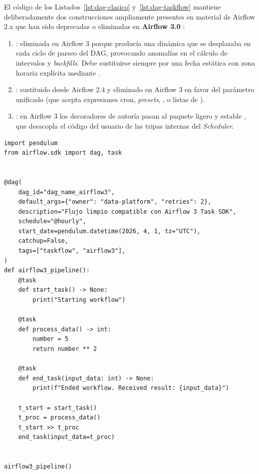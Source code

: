 \begin{modernbox}
El código de los Listados~\ref{lst:dag-clasico} y~\ref{lst:dag-taskflow} mantiene deliberadamente dos construcciones ampliamente presentes en material de Airflow 2.x que han sido deprecadas o eliminadas en \textbf{Airflow 3.0} :
\begin{enumerate}
  \item {} : eliminada en Airflow 3 porque producía una  dinámica que se desplazaba en cada ciclo de parseo del DAG, provocando anomalías en el cálculo de intervalos y \textit{backfills}. Debe sustituirse siempre por una fecha estática con zona horaria explícita mediante .
  \item {} : sustituido desde Airflow 2.4 y eliminado en Airflow 3 en favor del parámetro unificado  (que acepta expresiones cron, \textit{presets}, ,  o listas de ).
  \item {}: en Airflow 3 los decoradores de autoría pasan al paquete ligero y estable , que desacopla el código del usuario de las tripas internas del \textit{Scheduler}.
\end{enumerate}

\begin{lstlisting}[style=python, caption={Versión modernizada y limpia para Airflow 3.0+ usando \code{airflow.sdk} y \code{pendulum}.}, label={lst:dag-airflow3}]
import pendulum
from airflow.sdk import dag, task


@dag(
    dag_id="dag_name_airflow3",
    default_args={"owner": "data-platform", "retries": 2},
    description="Flujo limpio compatible con Airflow 3 Task SDK",
    schedule="@hourly",
    start_date=pendulum.datetime(2026, 4, 1, tz="UTC"),
    catchup=False,
    tags=["taskflow", "airflow3"],
)
def airflow3_pipeline():
    @task
    def start_task() -> None:
        print("Starting workflow")

    @task
    def process_data() -> int:
        number = 5
        return number ** 2

    @task
    def end_task(input_data: int) -> None:
        print(f"Ended workflow. Received result: {input_data}")

    t_start = start_task()
    t_proc = process_data()
    t_start >> t_proc
    end_task(input_data=t_proc)


airflow3_pipeline()
\end{lstlisting}
\end{modernbox}

